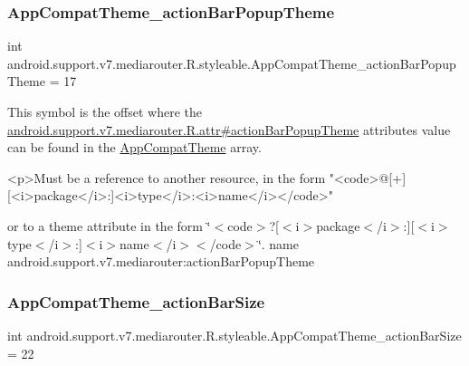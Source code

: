 \subsubsection{\texorpdfstring{App\+Compat\+Theme\+\_\+action\+Bar\+Popup\+Theme}{AppCompatTheme\_actionBarPopupTheme}}
{\footnotesize\ttfamily int android.\+support.\+v7.\+mediarouter.\+R.\+styleable.\+App\+Compat\+Theme\+\_\+action\+Bar\+Popup\+Theme = 17\hspace{0.3cm}{\ttfamily [static]}}

This symbol is the offset where the \hyperlink{classandroid_1_1support_1_1v7_1_1mediarouter_1_1R_1_1attr_abfb9b5bce455843ed1c8d5b58009669c}{android.\+support.\+v7.\+mediarouter.\+R.\+attr\#action\+Bar\+Popup\+Theme} attribute\textquotesingle{}s value can be found in the \hyperlink{classandroid_1_1support_1_1v7_1_1mediarouter_1_1R_1_1styleable_a4e3d3900c75d49aeb2f283cac00214d6}{App\+Compat\+Theme} array.

\begin{DoxyVerb}      <p>Must be a reference to another resource, in the form "<code>@[+][<i>package</i>:]<i>type</i>:<i>name</i></code>"
\end{DoxyVerb}
 or to a theme attribute in the form \char`\"{}$<$code$>$?\mbox{[}$<$i$>$package$<$/i$>$\+:\mbox{]}\mbox{[}$<$i$>$type$<$/i$>$\+:\mbox{]}$<$i$>$name$<$/i$>$$<$/code$>$\char`\"{}.  name android.\+support.\+v7.\+mediarouter\+:action\+Bar\+Popup\+Theme \mbox{\label{classandroid_1_1support_1_1v7_1_1mediarouter_1_1R_1_1styleable_a5c243aa267f830337d4803475264a5dc}} 
\subsubsection{\texorpdfstring{App\+Compat\+Theme\+\_\+action\+Bar\+Size}{AppCompatTheme\_actionBarSize}}
{\footnotesize\ttfamily int android.\+support.\+v7.\+mediarouter.\+R.\+styleable.\+App\+Compat\+Theme\+\_\+action\+Bar\+Size = 22\hspace{0.3cm}{\ttfamily [static]}}

